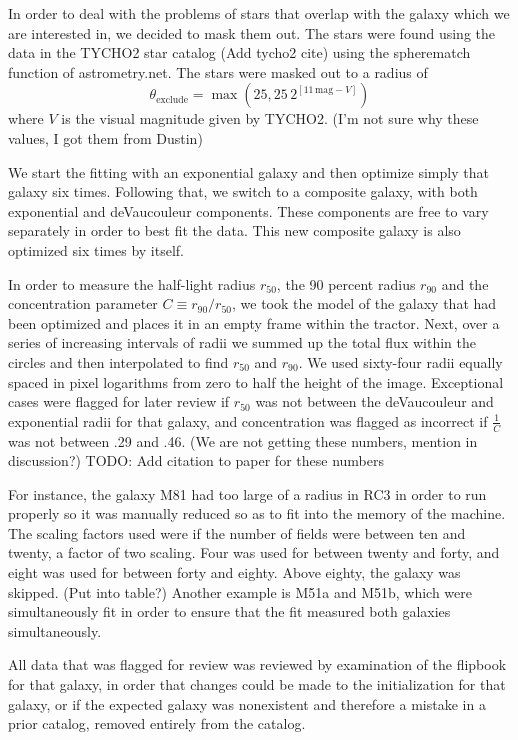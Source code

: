 \documentclass[12pt,preprint,pdftex]{aastex}
\newcommand{\units}[1]{\mathrm{#1}}
\renewcommand{\mag}{\units{mag}}
\newcommand{\rfifty}{r_{50}}
\newcommand{\rninety}{r_{90}}
\newcommand{\conc}{C}
\begin{document}
In order to deal with the problems of stars that overlap with the
galaxy which we are interested in, we decided to mask them out. The
stars were found using the data in the TYCHO2 star catalog (Add tycho2 cite)
 using the spherematch function of astrometry.net. The stars were masked out to a
radius of
\begin{equation}
\theta_{\mathrm{exclude}} = \max(25, 25\,2^{[11\,\mag-V]})
\end{equation}
where $V$ is the visual magnitude given by TYCHO2.
(I'm not sure why these values, I got them from Dustin)



We start the fitting with an exponential galaxy and then optimize
simply that galaxy six times. Following that, we switch to a composite
galaxy, with both exponential and deVaucouleur components. These
components are free to vary separately in order to best fit the
data. This new composite galaxy is also optimized six times by itself.

In order to measure the half-light radius $\rfifty$, the 90 percent
radius $\rninety$ and the concentration parameter $\conc\equiv
\rninety/\rfifty$, we took the model of the galaxy that had been
optimized and places it in an empty frame within the tractor. Next,
over a series of increasing intervals of radii we summed up the total
flux within the circles and then interpolated to find $\rfifty$ and $\rninety$. We used sixty-four radii equally spaced in pixel logarithms from zero to half the height of the image.
Exceptional cases were flagged for later review if $\rfifty$ was not between the deVaucouleur and exponential radii for that galaxy, and concentration was flagged as incorrect if $\frac{1}{\conc}$ was not between .29 and .46. (We are not getting these numbers, mention in discussion?) TODO: Add citation to paper for these numbers

For instance, the galaxy M81 had too large of a radius in RC3 in order to run properly so it was manually reduced so as to fit into the memory of the machine. The scaling factors used were if the number of fields were between ten and twenty, a factor of two scaling. Four was used for between twenty and forty, and eight was used for between forty and eighty. Above eighty, the galaxy was skipped. (Put into table?) Another example is M51a and M51b, which were simultaneously fit in order to ensure that the fit measured both galaxies simultaneously. 

All data that was flagged for review was reviewed by examination of the flipbook for that galaxy, in order that changes could be made to the initialization for that galaxy, or if the expected galaxy was nonexistent and therefore a mistake in a prior catalog, removed entirely from the catalog. 
\end{document}
